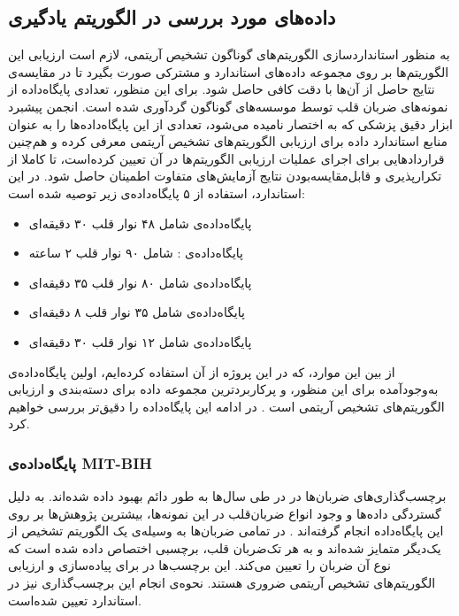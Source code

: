 	\subsection{داده‌های مورد بررسی در الگوریتم یادگیری}
	به منظور استانداردسازی الگوریتم‌های گوناگون تشخیص آریتمی، لازم است ارزیابی این الگوریتم‌ها بر روی مجموعه داده‌های استاندارد و مشترکی صورت بگیرد تا در مقایسه‌ی نتایج حاصل از آن‌ها با دقت کافی حاصل شود. برای این منظور، تعدادی پایگاه‌داده از نمونه‌های ضربان قلب توسط موسسه‌های گوناگون گردآوری شده است. انجمن پیشبرد ابزار دقیق پزشکی که به اختصار  نامیده می‌شود، تعدادی از این پایگاه‌داده‌ها را به عنوان منابع استاندارد داده برای ارزیابی الگوریتم‌های تشخیص آریتمی معرفی کرده و هم‌چنین قراردادهایی برای اجرای عملیات ارزیابی الگوریتم‌ها در آن تعیین کرده‌است، تا کاملا از تکرارپذیری و قابل‌مقایسه‌بودن نتایج آزمایش‌های متفاوت اطمینان حاصل شود. در این استاندارد، استفاده از ۵ پایگاه‌داده‌ی زیر توصیه شده است:
\begin{itemize}
	\item پایگاه‌داده‌ی  شامل ۴۸ نوار قلب ۳۰ دقیقه‌ای
	\item پایگاه‌داده‌ی : شامل ۹۰ نوار قلب ۲ ساعته
	\item پایگاه‌داده‌ی  شامل ۸۰ نوار قلب ۳۵ دقیقه‌ای
	\item پایگاه‌داده‌ی  شامل ۳۵ نوار قلب ۸ دقیقه‌ای
	\item پایگاه‌داده‌ی  شامل ۱۲ نوار قلب ۳۰ دقیقه‌ای
\end{itemize}	 
از بین این موارد،  که در این پروژه از آن استفاده کرده‌ایم، اولین پایگاه‌داده‌ی به‌وجودآمده برای این منظور، و پرکاربردترین مجموعه داده برای دسته‌بندی و ارزیابی الگوریتم‌های تشخیص آریتمی است \cite{ECGSurvey}. در ادامه این پایگاه‌داده را دقیق‌تر بررسی خواهیم کرد. 


		\subsubsection{پایگاه‌داده‌ی MIT-BIH}
		برچسب‌گذاری‌های ضربان‌ها در  در طی سال‌ها به طور دائم بهبود داده شده‌اند. به دلیل گستردگی داده‌ها و وجود انواع ضربان‌قلب در این نمونه‌‌ها، بیشترین پژوهش‌ها بر روی این پایگاه‌داده‌ انجام گرفته‌اند \cite{ECGSurvey}. 
در  تمامی ضربان‌ها به وسیله‌ی یک الگوریتم تشخیص  از یک‌دیگر متمایز شده‌اند و به هر تک‌ضربان قلب، برچسبی اختصاص داده شده است که نوع آن ضربان  را تعیین می‌کند. این برچسب‌ها در برای پیاده‌سازی و ارزیابی الگوریتم‌های تشخیص آریتمی ضروری هستند. نحوه‌ی انجام این برچسب‌گذاری نیز در استاندارد  تعیین شده‌است.

